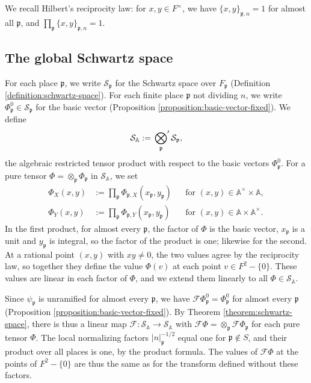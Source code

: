 \documentclass[reqno]{amsart}
\theoremstyle{plain}
\theoremstyle{definition}
\theoremstyle{itplain}
\numberwithin{equation}{section}
\numberwithin{theorem}{section}
\begin{document}
We recall Hilbert's reciprocity law: for $x, y \in F^\times$, we have $\{x, y\}_{\mathfrak{p}, n} = 1$ for almost all $\mathfrak{p}$, and $\prod_{\mathfrak{p}} \{x, y\}_{\mathfrak{p}, n} = 1$.

\subsection{The global Schwartz space}\label{sec:rational-points}
For each place $\mathfrak{p}$, we write $\mathcal{S}_{\mathfrak{p}}$ for the Schwartz space over $F_{\mathfrak{p}}$ (Definition \ref{definition:schwartz-space}).  For each finite place $\mathfrak{p}$ not dividing $n$, we write $\Phi_{\mathfrak{p}}^0 \in \mathcal{S}_{\mathfrak{p}}$ for the basic vector (Proposition \ref{proposition:basic-vector-fixed}).  We define
\begin{equation*}
  \mathcal{S}_{\mathbb{A}} := \sideset{}{'}\bigotimes_{\mathfrak{p}} \mathcal{S}_{\mathfrak{p}},
\end{equation*}
the algebraic restricted tensor product with respect to the basic vectors $\Phi_{\mathfrak{p}}^0$.  For a pure tensor $\Phi = \otimes_{\mathfrak{p}} \Phi_{\mathfrak{p}}$ in $\mathcal{S}_{\mathbb{A}}$, we set
\begin{align*}
  \Phi_X(x, y) &:= \prod_{\mathfrak{p}} \Phi_{\mathfrak{p}, X}(x_{\mathfrak{p}}, y_{\mathfrak{p}})
  && \text{for } (x, y) \in \mathbb{A}^\times \times \mathbb{A},
  \\
  \Phi_Y(x, y) &:= \prod_{\mathfrak{p}} \Phi_{\mathfrak{p}, Y}(x_{\mathfrak{p}}, y_{\mathfrak{p}})
  && \text{for } (x, y) \in \mathbb{A} \times \mathbb{A}^\times.
\end{align*}
In the first product, for almost every $\mathfrak{p}$, the factor of $\Phi$ is the basic vector, $x_{\mathfrak{p}}$ is a unit and $y_{\mathfrak{p}}$ is integral, so the factor of the product is one; likewise for the second.  At a rational point $(x, y)$ with $x y \neq 0$, the two values agree by the reciprocity law, so together they define the value $\Phi(v)$ at each point $v \in F^2 - \{0\}$.  These values are linear in each factor of $\Phi$, and we extend them linearly to all $\Phi \in \mathcal{S}_{\mathbb{A}}$.

Since $\psi_{\mathfrak{p}}$ is unramified for almost every $\mathfrak{p}$, we have $\mathcal{F} \Phi_{\mathfrak{p}}^0 = \Phi_{\mathfrak{p}}^0$ for almost every $\mathfrak{p}$ (Proposition \ref{proposition:basic-vector-fixed}).  By Theorem \ref{theorem:schwartz-space}, there is thus a linear map $\mathcal{F} : \mathcal{S}_{\mathbb{A}} \rightarrow \mathcal{S}_{\mathbb{A}}$ with $\mathcal{F} \Phi = \otimes_{\mathfrak{p}} \mathcal{F} \Phi_{\mathfrak{p}}$ for each pure tensor $\Phi$.  The local normalizing factors $\lvert n \rvert_{\mathfrak{p}}^{-1/2}$ equal one for $\mathfrak{p} \notin S$, and their product over all places is one, by the product formula.  The values of $\mathcal{F} \Phi$ at the points of $F^2 - \{0\}$ are thus the same as for the transform defined without these factors.
\end{document}
